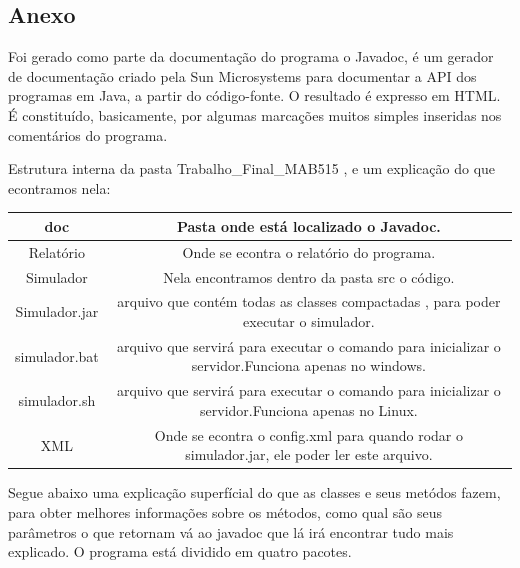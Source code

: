 \documentclass[a4paper,10pt]{article}
\begin{document}
      \subsection{Anexo}
      Foi gerado como parte da documentação do programa o Javadoc, é um gerador de documentação criado pela Sun Microsystems para documentar a API dos programas em Java, a partir do código-fonte.
      O resultado é expresso em HTML. É constituído, basicamente, por algumas marcações muitos simples inseridas nos comentários do programa.

      Estrutura interna da pasta Trabalho\_Final\_MAB515 , e um explicação do que econtramos nela:
      \begin{table}[H] 
	   \begin{tabular}{|c|c|}
		   \hline   
		    doc           & Pasta onde está localizado o Javadoc.		\\ \hline
		    Relatório     & Onde se econtra o relatório do programa.		\\ \hline
		    Simulador     & Nela encontramos dentro da pasta src o código.	\\ \hline
		    Simulador.jar & arquivo que contém todas as classes compactadas , para poder executar o simulador.	\\ \hline
		    simulador.bat & arquivo que servirá para executar o comando para inicializar o servidor.Funciona apenas no windows.	\\ \hline
		    simulador.sh  & arquivo que servirá para executar o comando para inicializar o servidor.Funciona apenas no Linux.	\\ \hline
		    XML           & Onde se econtra o config.xml para quando rodar o simulador.jar, ele poder ler este arquivo.	\\ \hline
		    
	   \end{tabular}
      \end{table}
      Segue abaixo uma explicação superfícial do que as classes e seus metódos fazem, para obter melhores informações sobre os métodos, como qual são seus parâmetros o que retornam vá ao javadoc que lá irá encontrar tudo mais explicado.
      O programa está dividido em quatro pacotes.
\end{document}

